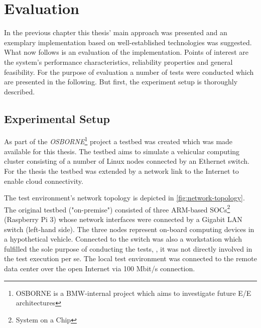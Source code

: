 
\chapter{Evaluation}\label{chapter:evaluation}

In the previous chapter this thesis' main approach was presented and an exemplary implementation based on well-established technologies was suggested. What now follows is an evaluation of the implementation. Points of interest are the system's performance characteristics, reliability properties and general feasibility. For the purpose of evaluation a number of tests were conducted which are presented in the following. But first, the experiment setup is thoroughly described.


\section{Experimental Setup}\label{sec:testsetup}

As part of the \emph{OSBORNE}\footnote{OSBORNE is a BMW-internal project which aims to investigate future E/E architectures} project a testbed was created which was made available for this thesis. The testbed aims to simulate a vehicular computing cluster consisting of a number of Linux nodes connected by an Ethernet switch. For the thesis the testbed was extended by a network link to the Internet to enable cloud connectivity. 

The test environment's network topology is depicted in \autoref{fig:network-topology}. The original testbed ("on-premise") consisted of three ARM-based SOCs\footnote{System on a Chip} (Raspberry Pi 3) whose network interfaces were connected by a Gigabit LAN switch (left-hand side). The three nodes represent on-board computing devices in a hypothetical vehicle. Connected to the switch was also a workstation which fulfilled the sole purpose of conducting the tests, \ie , it was not directly involved in the test execution per se. The local test environment was connected to the remote data center over the open Internet via 100 Mbit/s connection.

